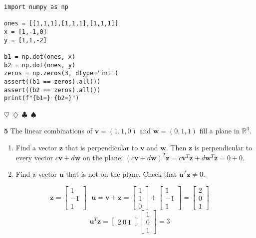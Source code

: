 \documentclass{article}
\newcommand{\sep}{\begin{center}$\heartsuit$~$\diamondsuit$~$\clubsuit$~$\spadesuit$\end{center}}
\newcommand{\vect}[1]{\ensuremath{\boldsymbol{#1}}}
\begin{document}
\begin{verbatim}
import numpy as np

ones = [[1,1,1],[1,1,1],[1,1,1]]
x = [1,-1,0]
y = [1,1,-2]

b1 = np.dot(ones, x)
b2 = np.dot(ones, y)
zeros = np.zeros(3, dtype='int')
assert((b1 == zeros).all())
assert((b2 == zeros).all())
print(f"{b1=} {b2=}")
\end{verbatim}

\sep

\noindent\textbf{5} The linear combinations of $\vect{v} = (1, 1, 0)$ and $\vect{w} = (0, 1, 1)$ fill a plane in $\mathbb{R}^3$.
\begin{enumerate}[label=(\alph*)]
\item Find a vector $\vect{z}$ that is perpendicular to $\vect{v}$ and $\vect{w}$. Then $\vect{z}$ is perpendicular to every vector $c\vect{v} + d\vect{w}$ on the plane: $(c\vect{v} + d\vect{w})^T \vect{z} = c\vect{v}^T\vect{z} + d\vect{w}^T\vect{z} = 0 + 0$. 
\item Find a vector $\vect{u}$ that is not on the plane. Check that $\vect{u}^T\vect{z} \not= 0$.
\end{enumerate}

\begin{displaymath}
  \vect{z} = \begin{bmatrix} 1 \\ -1 \\ 1 \end{bmatrix}
  ~~~
  \vect{u} = \vect{v} + \vect{z} = \begin{bmatrix} 1 \\ 1 \\ 0 \end{bmatrix} + \begin{bmatrix} 1 \\ -1 \\ 1 \end{bmatrix} = \begin{bmatrix} 2 \\ 0 \\ 1 \end{bmatrix}
\end{displaymath}
\begin{displaymath}
  \vect{u}^T\vect{z} = \begin{bmatrix} 2 ~ 0 ~ 1 \end{bmatrix} \begin{bmatrix} 1 \\ 0 \\ 1 \end{bmatrix} = 3
\end{displaymath}
\end{document}

